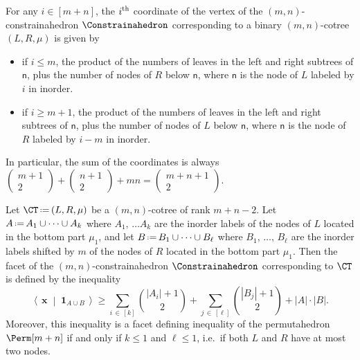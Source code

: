 \documentclass[AHL,Unicode,longabstracts,published]{cedram}
\renewcommand{\b}[1]{\boldsymbol{#1}}
\newcommand{\dotprod}[2]{\left\langle \, #1 \; \middle| \; #2 \, \right\rangle}
\newcommand{\one}{\b{1}}
\newcommand{\eqdef}{\mbox{\,\raisebox{0.2ex}{\scriptsize\ensuremath{\mathrm:}}\ensuremath{=}\,}}
\newcommand{\ie}{i.e.~}
\newcommand{\node}[1]{\mathsf{#1}}
\begin{document}
\begin{prop}\label{prop:verticesConstrainahedron}
For any $i \in [m+n]$, the $i^{\rm th}$ coordinate of the vertex of the $(m,n)$-constrainahedron $\Constrainahedron$ corresponding to a binary $(m,n)$-cotree $(L, R, \mu)$ is given by
\begin{itemize}
\item if $i \le m$, the product of the numbers of leaves in the left and right subtrees of $\node{n}$, plus the number of nodes of $R$ below $\node{n}$, where $\node{n}$ is the node of $L$ labeled by $i$ in inorder.
\item if $i \ge m+1$, the product of the numbers of leaves in the left and right subtrees of $\node{n}$, plus the number of nodes of $L$ below $\node{n}$, where $\node{n}$ is the node of $R$ labeled by $i-m$ in inorder.
\end{itemize}
In particular, the sum of the coordinates is always
$(\begin{smallmatrix} 
m+1\\2\end{smallmatrix}) + (\begin{smallmatrix}n+1\\2\end{smallmatrix}) + mn = (\begin{smallmatrix}
m+n+1\\2\end{smallmatrix})$.
\end{prop}

\begin{prop}\label{prop:facetsConstrainahedron}
Let $\CT \eqdef (L, R, \mu)$ be a $(m,n)$-cotree of rank $m+n-2$. Let~${A \eqdef A_1 \cup \dots \cup A_k}$ where $A_1,\,\dots A_k$ are the inorder labels of the nodes of $L$ located in the bottom part $\mu_1$, and let ${B \eqdef B_1 \cup \dots \cup B_\ell}$ where $B_1,\,\dots,\, B_\ell$ are the inorder labels shifted by $m$ of the nodes of $R$ located in the bottom part $\mu_1$. Then the facet of the $(m,n)$-constrainahedron $\Constrainahedron$ corresponding to $\CT$ is defined by the inequality
\[
\dotprod{\b{x}}{\one_{A \cup B}} \ge \sum_{i\,\in\,[k]} {\textstyle{\binom{|A_i|+1}{2}}} + \sum_{j\,\in\,[\ell]} {\textstyle{\binom{|B_j|+1}{2}}} + |A| \cdot |B|.
\]
Moreover, this inequality is a facet defining inequality of the permutahedron\linebreak ${\Perm[m+n]}$ if and only if $k \le 1$ and $\ell \le 1$, \ie if both $L$ and $R$ have at most two nodes.
\end{prop}
\end{document}
